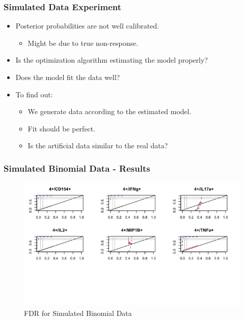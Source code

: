\documentclass{beamer}
\theoremstyle{definition}
\begin{document}

\begin{frame}
\frametitle{Simulated Data Experiment}
\begin{itemize}
\item Posterior probabilities are not well calibrated.
	\begin{itemize}
	\item Might be due to true non-response.
	\end{itemize}
\pause
\vspace{0.5 cm}
\item Is the optimization algorithm estimating the model properly?
\vspace{0.5 cm}
\item Does the model fit the data well? 

\pause
\vspace{0.5 cm}
\item To find out:
	\begin{itemize}
	\item We generate data according to the estimated model.
	\item Fit should be perfect. 
	\item Is the artificial data similar to the real data?
	\end{itemize} 
\end{itemize}
\end{frame}


\begin{frame}
\frametitle{Simulated Binomial Data - Results}
\begin{figure}[]
\includegraphics[width=12 cm]{figures/artificialBinomFDR} \caption{FDR for Simulated Binomial Data}
\end{figure}
\end{frame}
\end{document}
